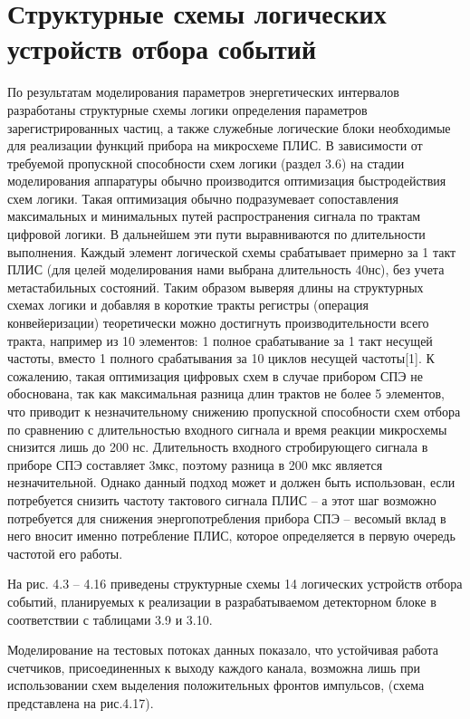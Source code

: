 \section{Структурные схемы логических устройств отбора событий}
По результатам моделирования параметров энергетических интервалов разработаны структурные схемы логики определения параметров зарегистрированных частиц, а также служебные логические блоки необходимые для реализации функций прибора на микросхеме ПЛИС. 
В зависимости от требуемой пропускной способности схем логики (раздел 3.6) на стадии моделирования аппаратуры обычно производится оптимизация быстродействия схем логики. Такая оптимизация обычно подразумевает сопоставления максимальных и минимальных путей распространения сигнала по трактам цифровой логики. В дальнейшем эти пути выравниваются по длительности выполнения. Каждый элемент логической схемы срабатывает примерно за 1 такт ПЛИС (для целей моделирования нами выбрана длительность 40нс), без учета метастабильных состояний. Таким образом выверяя длины на структурных схемах логики и добавляя в короткие тракты регистры (операция конвейеризации) теоретически можно достигнуть производительности всего тракта, например из 10 элементов: 1 полное срабатывание за 1 такт несущей частоты, вместо 1 полного срабатывания за 10 циклов несущей частоты[1]. К сожалению, такая оптимизация цифровых схем в случае  прибором СПЭ не обоснована, так как максимальная разница длин трактов не более 5 элементов, что приводит к незначительному снижению пропускной способности схем отбора по сравнению с длительностью входного сигнала и время реакции микросхемы снизится лишь до 200 нс. Длительность входного стробирующего сигнала в приборе СПЭ составляет 3мкс, поэтому разница в 200 мкс является незначительной. Однако данный подход может и должен быть использован, если потребуется снизить частоту тактового сигнала ПЛИС – а этот шаг возможно потребуется для снижения энергопотребления прибора СПЭ – весомый вклад в него вносит именно потребление ПЛИС, которое определяется в первую очередь частотой его работы.


На рис. 4.3 – 4.16 приведены структурные схемы 14 логических устройств отбора событий, планируемых к реализации в разрабатываемом детекторном блоке в соответствии с таблицами 3.9 и 3.10.



Моделирование на тестовых потоках данных показало, что устойчивая работа счетчиков, присоединенных к выходу каждого канала, возможна лишь при использовании схем выделения положительных фронтов импульсов, (схема представлена на рис.4.17).

